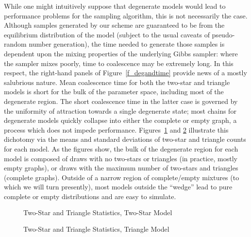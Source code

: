 \documentclass[11pt]{article}
\begin{document}
While one might intuitively suppose that degenerate models would lead to performance problems for the sampling algorithm, this is not necessarily the case.  Although samples generated by our scheme are guaranteed to be from the equilibrium distribution of the model (subject to the usual caveats of pseudo-random number generation), the time needed to generate those samples is dependent upon the mixing properties of the underlying Gibbs sampler: where the sampler mixes poorly, time to coalescence may be extremely long.  In this respect, the right-hand panels of Figure~\ref{f_degandtime} provide news of a mostly salubrious nature.  Mean coalescence time for both the two-star and triangle models is short for the bulk of the parameter space, including most of the degenerate region.  The short coalescence time in the latter case is governed by the uniformity of attraction towards a single degenerate state; most chains for degenerate models quickly collapse into either the complete or empty graph, a process which does not impede performance.  Figures~\ref{f_2stri_2smod} and \ref{f_2stri_trimod} illustrate this dichotomy via the means and standard deviations of two-star and triangle counts for each model.  As the figures show, the bulk of the degenerate region for each model is composed of draws with no two-stars or triangles (in practice, mostly empty graphs), or draws with the maximum number of two-stars and triangles (complete graphs).  Outside of a narrow region of complete/empty mixtures (to which we will turn presently), most models outside the ``wedge'' lead to pure complete or empty distributions and are easy to simulate.

\begin{figure}
\begin{center}
\caption{\label{f_2stri_2smod} Two-Star and Triangle Statistics, Two-Star Model}
\end{center}
\end{figure}

\begin{figure}
\begin{center}
\caption{\label{f_2stri_trimod} Two-Star and Triangle Statistics, Triangle Model}
\end{center}
\end{figure}
\end{document}
